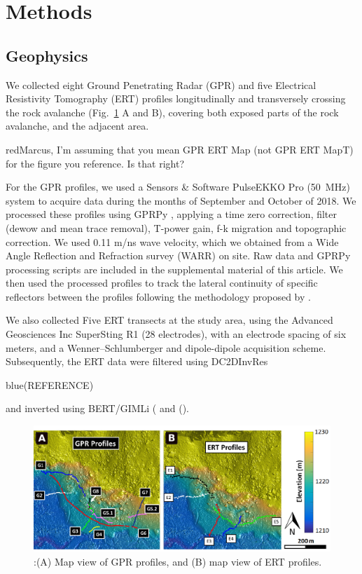 \documentclass[utf8]{frontiersSCNS}
\newcommand{\COMON}{\begin{color}{blue}}
\newcommand{\COMOFF}{\end{color}}
\newcommand{\alon}{\begin{color}{red}}
\newcommand{\aloff}{\end{color}}
\begin{document}



\section{Methods}

\subsection{Geophysics}

We collected eight Ground Penetrating Radar
    (GPR) and five Electrical Resistivity Tomography (ERT) profiles
    longitudinally and transversely crossing the rock avalanche
    (Fig.~\ref{GPR_ERT_Map} A and B), covering both exposed parts of the rock
    avalanche, and the adjacent area.\alon Marcus, I'm assuming that
    you mean GPR ERT Map (not GPR ERT MapT) for the figure you
    reference. Is that right? \aloff

For the GPR profiles, we used a Sensors \& Software PulseEKKO Pro (\SI{50}{\mega Hz}) system to acquire data during the months of September and October of 2018. We processed these profiles using GPRPy \citep{plattner2019comunity,Plattner2019}, applying a time zero correction, filter (dewow and mean trace removal), T-power gain, f-k migration \citep{stolt1978migration} and topographic correction. We used 0.11 m/ns wave velocity, which we obtained from a Wide Angle Reflection and Refraction survey (WARR) on site. Raw data and GPRPy processing scripts are included in the supplemental material of this article. We then used the processed profiles to track the lateral continuity of specific reflectors between the profiles following the methodology proposed by \citep{mitchum1977seismic}.

We also collected Five ERT transects at the study area, using the Advanced Geosciences Inc SuperSting R1 (28 electrodes), with an electrode spacing of six meters, and a Wenner–Schlumberger and dipole-dipole acquisition scheme. Subsequently, the ERT data were filtered using DC2DInvRes \COMON (REFERENCE) \COMOFF and inverted using BERT/GIMLi (\cite{gunther2006three} and (\cite{Ruecker2017}).


								 \begin{figure}[h]

	\includegraphics[width=\textwidth]{Figures/GPR_ERT_Map.pdf}
		\caption{:(A) Map view of GPR profiles, and (B) map view of ERT profiles. \label{GPR_ERT_Map}}

								   \end{figure}
\end{document}
